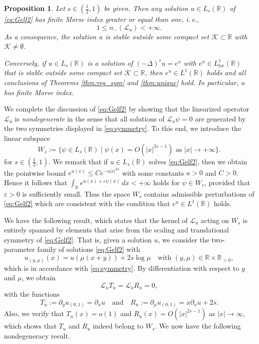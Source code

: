 \documentclass[reqno,10pt,a4paper]{amsart}
\newtheorem{prop}{Proposition}[section]
\theoremstyle{definition}
\theoremstyle{definition}
\theoremstyle{remark}
\theoremstyle{remark}
\numberwithin{equation}{section}
\newcommand{\R}{\mathbb{R}}
\newcommand{\pt}{\partial}
\newcommand{\eps}{\varepsilon}
\newcommand{\KK}{\mathcal{K}}
\newcommand{\Ds}{(-\Delta)^{s}}
\newcommand{\Lloc}{L_{\mathrm{loc}}}
\newcommand{\LL}{\mathcal{L}}
\begin{document}
\begin{prop} \label{prop:morse}
Let $s \in (\frac 1 2,1)$ be given. Then any solution $u \in L_s(\R)$ of \eqref{eq:Gelf2} has finite Morse index greater or equal than one, i.\,e.,
$$
1 \leq n_-(\LL_u)  < +\infty.
$$
As a consequence, the solution $u$ is stable outside some compact set $\KK \subset \R$ with $\KK \neq \emptyset$.

Conversely, if $u \in L_s(\R)$ is a solution of $\Ds u = e^u$ with $e^u \in \Lloc^1(\R)$ that is stable outside some compact set $\KK \subset \R$, then $e^u \in L^1(\R)$ holds and all conclusions of Theorems \ref{thm:reg_sym} and \ref{thm:unique} hold. In particular, $u$ has finite Morse index. 
\end{prop}

We complete the discussion of \eqref{eq:Gelf2} by showing that the linearized operator $\LL_u$ is {\em nondegenerate} in the sense that all solutions of $\LL_u \psi = 0$ are generated by the two symmetries displayed in \eqref{eq:symmetry}. To this end, we introduce the linear subspace
$$
W_s := \{ \psi \in L_s(\R) \mid \mbox{$\psi(x) = O(|x|^{2s-1})$ as $|x| \to +\infty$} \}.
$$
for $s \in (\frac{1}{2},1)$. We remark that if $u \in L_s(\R)$ solves \eqref{eq:Gelf2}, then we obtain the pointwise bound $e^{u(x)} \leq C e^{-a |x|^{2 \alpha}}$ with some constants $a > 0$ and $C > 0$. Hence it follows that $\int_{\R} e^{u(x) + \eps \psi(x)} \,dx < +\infty$ holds for $\psi \in W_s$, provided that $\eps > 0$ is sufficiently small. Thus the space $W_s$ contains admissible perturbations of \eqref{eq:Gelf2} which are consistent with the condition that $e^u \in L^1(\R)$ holds. 

We have the following result, which states that the kernel of $\LL_u$ acting on $W_s$ is entirely spanned by elements that arise from the scaling and translational symmetry of \eqref{eq:Gelf2}. That is, given a solution $u$, we consider the two-parameter family of solutions \eqref{eq:Gelf2} with
$$
u_{(y, \mu)}(x) = u \left (\mu(x+y) \right ) + 2 s \log \mu \quad \mbox{with $(y,\mu) \in \R \times \R_{>0}$},
$$
which is in accordance with \eqref{eq:symmetry}. By differentiation with respect to $y$ and $\mu$, we obtain
$$
\LL_u T_u = \LL_u R_u = 0,
$$
with the functions
$$
T_u := \pt_y u_{(0,1)}  = \pt_x u \quad \mbox{and} \quad  R_u := \pt_\mu u_{(0,1)}  = x \pt_x u + 2s.
$$
Also, we verify that $T_u(x) = o(1)$ and $R_u(x) = O(|x|^{2s-1})$ as $|x| \to \infty$, which shows that $T_u$ and $R_u$ indeed belong to  $W_s$. We now have the following nondegeneracy result.
\end{document}
